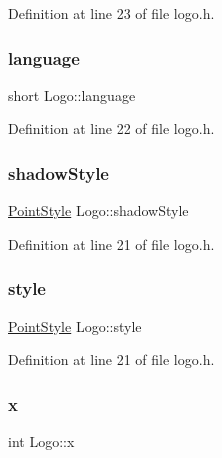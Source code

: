 Definition at line 23 of file logo.\+h.

\mbox{\label{class_logo_ac3f13aa3fd16b904a71157e6ff47e48e}} 
\subsubsection{\texorpdfstring{language}{language}}
{\footnotesize\ttfamily short Logo\+::language\hspace{0.3cm}{\ttfamily [private]}}



Definition at line 22 of file logo.\+h.

\mbox{\label{class_logo_a73d851ecd0cf3b7513f47df2aa462142}} 
\subsubsection{\texorpdfstring{shadowStyle}{shadowStyle}}
{\footnotesize\ttfamily \mbox{\hyperlink{common_8h_afd9cb36d6ef309c77ea1e3177e19c623}{Point\+Style}} Logo\+::shadow\+Style\hspace{0.3cm}{\ttfamily [private]}}



Definition at line 21 of file logo.\+h.

\mbox{\label{class_logo_a2a0115dd4566f475c108eb3728265b62}} 
\subsubsection{\texorpdfstring{style}{style}}
{\footnotesize\ttfamily \mbox{\hyperlink{common_8h_afd9cb36d6ef309c77ea1e3177e19c623}{Point\+Style}} Logo\+::style\hspace{0.3cm}{\ttfamily [private]}}



Definition at line 21 of file logo.\+h.

\mbox{\label{class_logo_ab25a813d9b3635c4b524dab9bc2ee86e}} 
\subsubsection{\texorpdfstring{x}{x}}
{\footnotesize\ttfamily int Logo\+::x\hspace{0.3cm}{\ttfamily [private]}}



